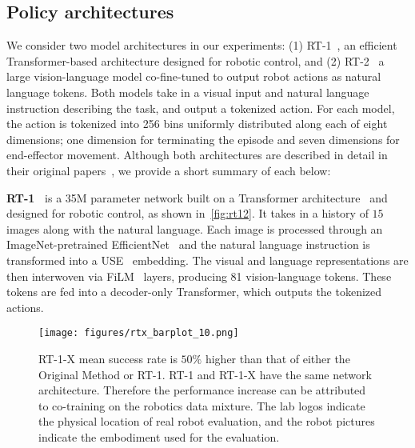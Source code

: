 \vspace{-0.2em}
\subsection{Policy architectures}
\vspace{-0.1em}

We consider two model architectures in our experiments: (1) RT-1~\cite{brohan2023rt1}, an efficient Transformer-based architecture designed for robotic control, and (2) RT-2~\cite{brohan2023rt2} a large vision-language model co-fine-tuned to output robot actions as natural language tokens.
Both models take in a visual input and natural language instruction describing the task, and output a tokenized action. 
For each model, the action is tokenized into 256 bins uniformly distributed along each of eight dimensions; one dimension for terminating the episode and seven dimensions for end-effector movement. %
Although both architectures are described in detail in their original papers~\cite{brohan2023rt1,brohan2023rt2}, we provide a short summary of each below:

\textbf{RT-1~\cite{brohan2023rt1}} is a 35M parameter network built on a Transformer architecture~\cite{vaswani2017attention} and designed for robotic control, as shown in~\cref{fig:rt12}. 
It takes in a history of $15$ images along with the natural language. Each image is processed through an ImageNet-pretrained EfficientNet~\cite{tan2019efficientnet} and the natural language instruction is transformed into a USE~\cite{cer2018universal} embedding. 
The visual and language representations are then interwoven via FiLM~\cite{perez2017film} layers, producing 81 vision-language tokens. 
These tokens are fed into a decoder-only Transformer, which outputs the tokenized actions.

\begin{figure*}[!htbp]
    \centering
    \texttt{[image: figures/rtx\_barplot\_10.png]}
    \caption{\small RT-1-X mean success rate is $50\%$ higher than that of either the Original Method or RT-1. RT-1 and RT-1-X have the same network architecture. Therefore the performance increase can be attributed to co-training on the robotics data mixture. 
    The lab logos indicate the physical location of real robot evaluation, and the robot pictures indicate the embodiment used for the evaluation.}
    \label{fig:rt_x_barplot}
    \vspace{-1.9em}
\end{figure*}

